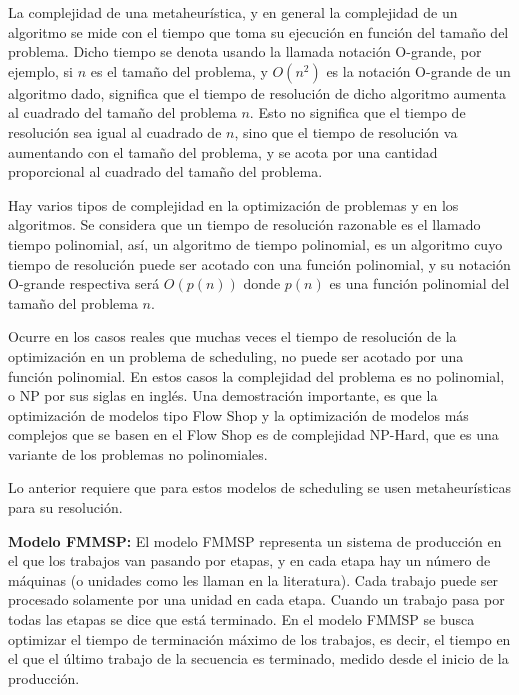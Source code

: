 \documentclass{article}
\begin{document}
\vspace{\baselineskip}
La complejidad de una metaheurística, y en general la complejidad de un
algoritmo se mide con el tiempo que toma su ejecución en función del tamaño
del problema. Dicho tiempo se denota usando la llamada notación O-grande,
por ejemplo, si $n$ es el tamaño del problema, y $O(n^2)$ es la notación
O-grande de un algoritmo dado, significa que el tiempo de resolución de
dicho algoritmo aumenta al cuadrado del tamaño del problema $n$. Esto no
significa que el tiempo de resolución sea igual al cuadrado de $n$, sino
que el tiempo de resolución va aumentando con el tamaño del problema, y
se acota por una cantidad proporcional al cuadrado del tamaño del problema.
\autocite{metaTalbi}

\vspace{\baselineskip}
Hay varios tipos de complejidad en la optimización de problemas y en los
algoritmos. Se considera que un tiempo de resolución razonable es el llamado
tiempo polinomial, así, un algoritmo de tiempo polinomial, es un algoritmo
cuyo tiempo de resolución puede ser acotado con una función polinomial, y
su notación O-grande respectiva será $O(p(n))$ donde $p(n)$ es una función
polinomial del tamaño del problema $n$. \autocite{metaTalbi}

\vspace{\baselineskip}
Ocurre en los casos reales que muchas veces el tiempo de resolución de la 
optimización en un problema de scheduling, no puede ser acotado por una
función polinomial. En estos casos la complejidad del problema es no
polinomial, o NP por sus siglas en inglés. Una demostración importante, es
que la optimización de modelos tipo Flow Shop y la optimización de modelos 
más complejos
que se basen en el Flow Shop es de complejidad NP-Hard, que es una variante
de los problemas no polinomiales. \autocite{flowCompl}

\vspace{\baselineskip}
Lo anterior requiere que para estos modelos de scheduling se usen
metaheurísticas para su resolución.

\vspace{\baselineskip}
\textbf{Modelo FMMSP:} El modelo FMMSP representa un sistema de producción
en el que los trabajos van pasando por etapas, y en cada etapa hay un
número de máquinas (o unidades como les llaman en la literatura). Cada
trabajo puede ser procesado solamente por una unidad en cada etapa. Cuando
un trabajo pasa por todas las etapas se dice que está terminado. En el
modelo FMMSP se busca optimizar el tiempo de terminación máximo de los
trabajos, es decir, el tiempo en el que el último trabajo de la secuencia
es terminado, medido desde el inicio de la producción. \autocite{modFMMSP}
\end{document}
